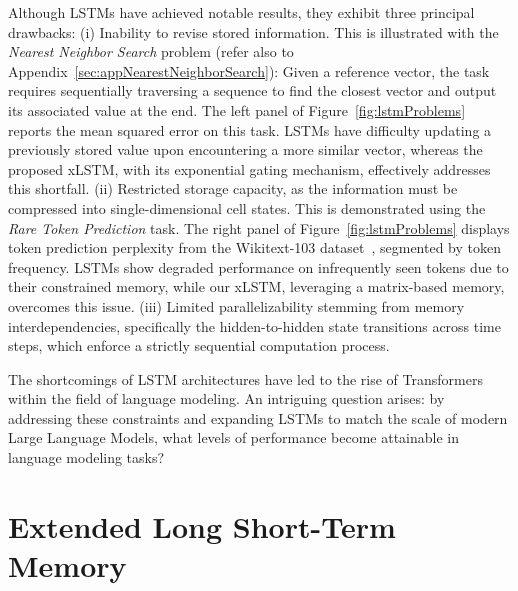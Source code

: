 Although LSTMs have achieved notable results, they exhibit three principal drawbacks: (i) Inability to revise stored information. This is illustrated with the {\it Nearest Neighbor Search} problem (refer also to Appendix~\ref{sec:appNearestNeighborSearch}): Given a reference vector, the task requires sequentially traversing a sequence to find the closest vector and output its associated value at the end. The left panel of Figure~\ref{fig:lstmProblems} reports the mean squared error on this task. LSTMs have difficulty updating a previously stored value upon encountering a more similar vector, whereas the proposed xLSTM, with its exponential gating mechanism, effectively addresses this shortfall. (ii) Restricted storage capacity, as the information must be compressed into single-dimensional cell states. This is demonstrated using the {\it Rare Token Prediction} task. The right panel of Figure~\ref{fig:lstmProblems} displays token prediction perplexity from the Wikitext-103 dataset~\citep{Merity:17}, segmented by token frequency. LSTMs show degraded performance on infrequently seen tokens due to their constrained memory, while our xLSTM, leveraging a matrix-based memory, overcomes this issue. (iii) Limited parallelizability stemming from memory interdependencies, specifically the hidden-to-hidden state transitions across time steps, which enforce a strictly sequential computation process.

The shortcomings of LSTM architectures have led to the rise of Transformers~\citep{Vaswani:17} within the field of language modeling. An intriguing question arises: by addressing these constraints and expanding LSTMs to match the scale of modern Large Language Models, what levels of performance become attainable in language modeling tasks?

\section{Extended Long Short-Term Memory}
\label{sec:xLSTM}

